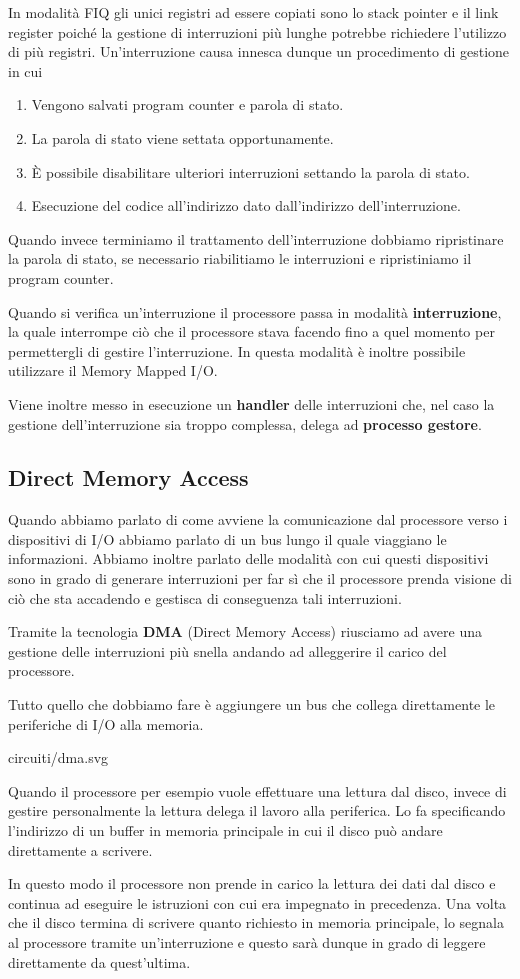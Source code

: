 In modalità FIQ gli unici registri ad essere copiati sono lo stack pointer e il link register
poiché la gestione di interruzioni più lunghe potrebbe richiedere l'utilizzo di più registri.
Un'interruzione causa innesca dunque un procedimento di gestione in cui
\begin{enumerate}
	\item Vengono salvati program counter e parola di stato.
	\item La parola di stato viene settata opportunamente.
	\item \`E possibile disabilitare ulteriori interruzioni settando la parola di stato.
	\item Esecuzione del codice all'indirizzo dato dall'indirizzo dell'interruzione.
\end{enumerate}
Quando invece terminiamo il trattamento dell'interruzione dobbiamo ripristinare la parola di stato,
se necessario riabilitiamo le interruzioni e ripristiniamo il program counter.

Quando si verifica un'interruzione il processore passa in modalità \textbf{interruzione}, la quale
interrompe ciò che il processore stava facendo fino a quel momento per permettergli di gestire
l'interruzione. In questa modalità è inoltre possibile utilizzare il Memory Mapped I/O.

Viene inoltre messo in esecuzione un \textbf{handler} delle interruzioni che, nel caso la gestione
dell'interruzione sia troppo complessa, delega ad \textbf{processo gestore}.

\subsection{Direct Memory Access}
Quando abbiamo parlato di come avviene la comunicazione dal processore verso i dispositivi di I/O
abbiamo parlato di un bus lungo il quale viaggiano le informazioni. Abbiamo inoltre parlato delle
modalità con cui questi dispositivi sono in grado di generare interruzioni per far sì che il
processore prenda visione di ciò che sta accadendo e gestisca di conseguenza tali interruzioni.

Tramite la tecnologia \textbf{DMA} (Direct Memory Access) riusciamo ad avere una gestione delle
interruzioni più snella andando ad alleggerire il carico del processore.

Tutto quello che dobbiamo fare è aggiungere un bus che collega direttamente le periferiche di I/O
alla memoria.
\begin{center}
	 {circuiti/dma.svg}
\end{center}
Quando il processore per esempio vuole effettuare una lettura dal disco, invece di gestire
personalmente la lettura delega il lavoro alla periferica. Lo fa specificando l'indirizzo di un
buffer in memoria principale in cui il disco può andare direttamente a scrivere.

In questo modo il processore non prende in carico la lettura dei dati dal disco e continua ad
eseguire le istruzioni con cui era impegnato in precedenza. Una volta che il disco termina di
scrivere quanto richiesto in memoria principale, lo segnala al processore tramite un'interruzione e
questo sarà dunque in grado di leggere direttamente da quest'ultima.
